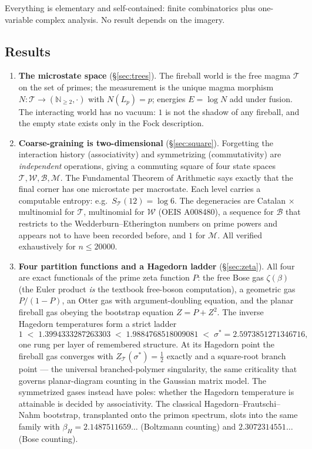 \documentclass[11pt]{article}
\newcommand{\cT}{\mathcal{T}}   %
\newcommand{\cW}{\mathcal{W}}   %
\newcommand{\cB}{\mathcal{B}}   %
\newcommand{\cM}{\mathcal{M}}   %
\newcommand{\NN}{\mathbb{N}}
\numberwithin{equation}{section}
\theoremstyle{plain}
\theoremstyle{definition}
\theoremstyle{remark}
\begin{document}
Everything is elementary and self-contained: finite combinatorics plus one-variable
complex analysis. No result depends on the imagery.

\subsection{Results}

\begin{enumerate}
\item \textbf{The microstate space} (\S\ref{sec:trees}). The fireball world is the
free magma $\cT$ on the set of primes; the measurement is the unique magma morphism
$N\colon \cT \to (\NN_{\ge2},\cdot)$ with $N(L_p) = p$; energies
$E = \log N$ add under fusion. The interacting world has no vacuum: $1$ is not the
shadow of any fireball, and the empty state exists only in the Fock description.

\item \textbf{Coarse-graining is two-dimensional} (\S\ref{sec:square}). Forgetting the
interaction history (associativity) and symmetrizing (commutativity) are
\emph{independent} operations, giving a commuting square of four state spaces
$\cT, \cW, \cB, \cM$. The Fundamental Theorem of Arithmetic says exactly that the
final corner has one microstate per macrostate. Each level carries a computable
entropy: e.g.\ $S_\cT(12) = \log 6$. The degeneracies are Catalan $\times$ multinomial
for $\cT$, multinomial for $\cW$ (OEIS A008480), a sequence for $\cB$ that restricts
to the Wedderburn--Etherington numbers on prime powers and appears not to have been
recorded before, and $1$ for $\cM$. All verified exhaustively for $n \le 20000$.

\item \textbf{Four partition functions and a Hagedorn ladder} (\S\ref{sec:zeta}). All
four are exact functionals of the prime zeta function $P$: the free Bose gas
$\zeta(\beta)$ (the Euler product \emph{is} the textbook free-boson computation), a
geometric gas $P/(1-P)$, an Otter gas with argument-doubling equation, and the planar
fireball gas obeying the bootstrap equation $Z = P + Z^2$. The inverse Hagedorn
temperatures form a strict ladder
\[
1 \;<\; 1.3994333287263303 \;<\; 1.9884768518009081 \;<\; \sigma^{*} = 2.5973851271346716 ,
\]
one rung per layer of remembered structure. At its Hagedorn point the fireball gas
converges with $Z_\cT(\sigma^{*}) = \tfrac12$ exactly and a square-root branch point
--- the universal branched-polymer singularity, the same criticality that governs
planar-diagram counting in the Gaussian matrix model. The symmetrized gases instead
have poles: whether the Hagedorn temperature is attainable is decided by
associativity. The classical Hagedorn--Frautschi--Nahm bootstrap, transplanted onto
the primon spectrum, slots into the same family with
$\beta_H = 2.1487511659\dots$ (Boltzmann counting) and $2.3072314551\dots$ (Bose
counting).


\end{enumerate}
\end{document}
